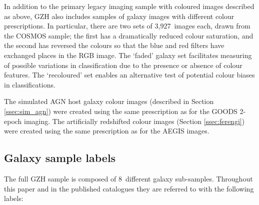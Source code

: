 \documentclass[a4paper,fleqn,usenatbib]{mnras}
\begin{document}
In addition to the primary \hst{} legacy imaging sample with coloured images
described as above, GZH also includes samples of \hst{} galaxy images with
different colour prescriptions. In particular, there are two sets of 3,927~images
each, drawn from the COSMOS sample; the first has a dramatically reduced colour
saturation, and the second has reversed the colours so that the blue and red
filters have exchanged places in the RGB image. The `faded' galaxy set
facilitates measuring of possible variations in classification due to the
presence or absence of colour features. The `recoloured' set enables an
alternative test of potential colour biases in classifications.

The simulated AGN host galaxy colour images (described in Section \ref{ssec:sim_agn})
were created using the same prescription as for the GOODS 2-epoch imaging. The
artificially redshifted colour images (Section \ref{ssec:ferengi}) were created using the
same prescription as for the AEGIS images.


\subsection{Galaxy sample labels}\label{ssec:sample_labels}

The full GZH sample is composed of 8~different galaxy sub-samples. Throughout
this paper and in the published catalogues they are referred to with the
following labels:
\end{document}
